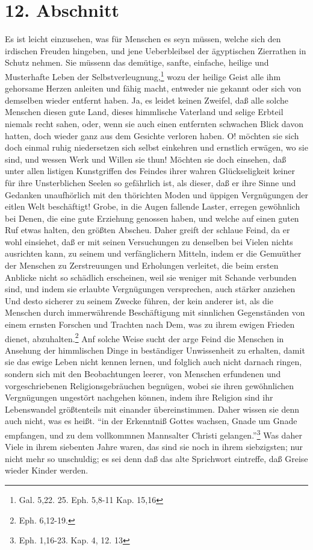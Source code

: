 \section{12. Abschnitt} \label{kap17_ab12}

Es ist leicht einzusehen, was für Menschen es seyn müssen, welche sich den
irdischen Freuden hingeben, und jene Ueberbleibsel der ägyptischen Zierrathen in
Schutz nehmen. Sie müssenn das demütige, sanfte, einfache, heilige und
Musterhafte Leben der Selbstverleugnung,\footnote{Gal. 5,22. 25. Eph. 5,8-11
Kap. 15,16} wozu der heilige Geist alle ihm gehorsame Herzen anleiten und fähig
macht, entweder nie gekannt oder sich von demselben wieder entfernt haben. Ja,
es leidet keinen Zweifel, daß alle solche Menschen diesen gute Land, dieses
himmlische Vaterland und selige Erbteil niemals recht sahen, oder, wenn sie auch
einen entfernten schwachen Blick davon hatten, doch wieder ganz aus dem Gesichte
verloren haben. O! möchten sie sich doch einmal ruhig niedersetzen sich selbst
einkehren und ernstlich erwägen, wo sie sind, und wessen Werk und Willen sie
thun! Möchten sie doch einsehen, daß unter allen listigen Kunstgriffen des
Feindes ihrer wahren Glückseligkeit keiner für ihre Unsterblichen Seelen so
gefährlich ist, als dieser, daß er ihre Sinne und Gedanken unaufhörlich mit den
thörichten Moden und üppigen Vergnügungen der eitlen Welt beschäftigt! Grobe, in
die Augen fallende Laster, erregen gewöhnlich bei Denen, die eine gute Erziehung
genossen haben, und welche auf einen guten Ruf etwas halten, den größten
Abscheu. Daher greift der schlaue Feind, da er wohl einsiehet, daß er mit seinen
Versuchungen zu denselben bei Vielen nichts ausrichten kann, zu seinem und
verfänglichern Mitteln, indem er die Gemuüther der Menschen zu Zerstreuungen und
Erholungen verleitet, die beim ersten Anblicke nicht so schädlich erscheinen,
weil sie weniger mit Schande verbunden sind, und indem sie erlaubte Vergnügungen
versprechen, auch stärker anziehen Und desto sicherer zu seinem Zwecke führen,
der kein anderer ist, als die Menschen durch immerwährende Beschäftigung mit
sinnlichen Gegenständen von einem ernsten Forschen und Trachten nach Dem, was zu
ihrem ewigen Frieden dienet, abzuhalten.\footnote{Eph. 6,12-19.} Anf solche
Weise sucht der arge Feind die Menschen in Ansehung der himmlischen Dinge in
beständiger Unwissenheit zu erhalten, damit sie das ewige Leben nicht kennen
lernen, und folglich auch nicht darnach ringen, sondern sich mit den
Beobachtungen leerer, von Menschen erfundenen und vorgeschriebenen
Religionsgebräuchen begnügen, wobei sie ihren gewöhnlichen Vergnügungen
ungestört nachgehen können, indem ihre Religion sind ihr Lebenswandel
größtenteils mit einander übereinstimmen. Daher wissen sie denn auch nicht, was
es heißt. "`in der Erkenntniß Gottes wachsen, Gnade um Gnade empfangen, und zu
dem vollkommnen Mannsalter Christi gelangen."'\footnote{Eph. 1,16-23. Kap. 4,
12. 13} Was daher Viele in ihrem siebenten Jahre waren, das sind sie noch in
ihrem siebzigsten; nur nicht mehr so unschuldig; es sei denn daß das alte
Sprichwort eintreffe, daß Greise wieder Kinder werden.

